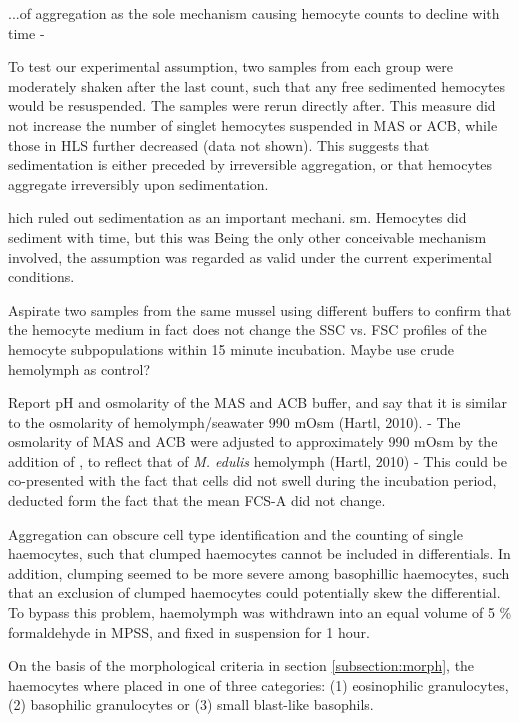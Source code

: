 
 ...of aggregation as the sole mechanism causing hemocyte counts to decline with time - 


 To test our experimental assumption, two samples from each group were moderately shaken after the last count, such that any free sedimented hemocytes would be resuspended. The samples were rerun directly after. This measure did not increase the number of singlet hemocytes suspended in MAS or ACB, while those in HLS further decreased (data not shown). This suggests that sedimentation is either preceded by irreversible aggregation, or that hemocytes aggregate irreversibly upon sedimentation. 

hich ruled out sedimentation as an important mechani. sm. Hemocytes did sediment with time, but this was Being the only other conceivable mechanism involved, the assumption was regarded as valid under the current experimental conditions.


Aspirate two samples from the same mussel using different buffers to confirm that the hemocyte medium in fact does not change the SSC vs. FSC profiles of the hemocyte subpopulations within 15 minute incubation. Maybe use crude hemolymph as control?
 

Report pH and osmolarity of the MAS and ACB buffer, and say that it is similar to the osmolarity of hemolymph/seawater 990 mOsm (Hartl, 2010).
- The osmolarity of MAS and ACB were adjusted to approximately 990 mOsm by the addition of , to reflect that of \emph{M. edulis} hemolymph (Hartl, 2010)
- This could be co-presented with the fact that cells did not swell during the incubation period, deducted form the fact that the mean FCS-A did not change.

Aggregation can obscure cell type identification and the counting of single haemocytes, such that clumped haemocytes cannot be included in differentials. In addition, clumping seemed to be more severe among basophillic haemocytes, such that an exclusion of clumped haemocytes could potentially skew the differential. To bypass this problem, haemolymph was withdrawn into an equal volume of 5 \% formaldehyde in MPSS, and fixed in suspension for 1 hour. 

 On the basis of the morphological criteria in section \ref{subsection:morph}, the haemocytes where placed in one of three categories: (1) eosinophilic granulocytes, (2) basophilic granulocytes or (3) small blast-like basophils. 


